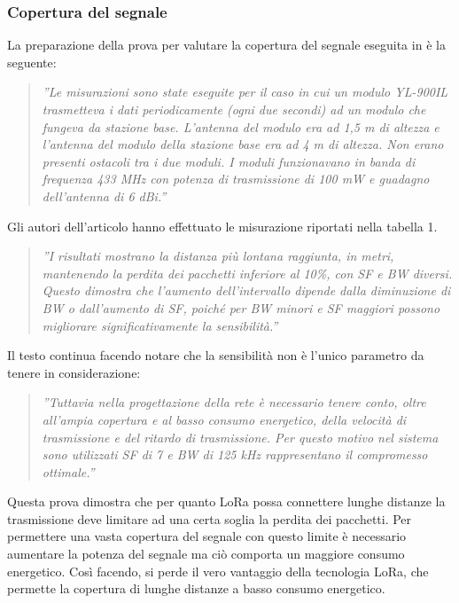 \documentclass[a4paper]{report} %
\begin{document}
\subsubsection{Copertura del segnale}
La preparazione della prova per valutare la copertura del segnale eseguita in \cite{art:rif.44} è la seguente:
\begin{quote}
	\textit{''Le misurazioni sono state eseguite per il caso in cui un modulo YL-900IL trasmetteva i dati periodicamente (ogni due secondi) ad un modulo che fungeva da stazione base. L'antenna del modulo era ad 1,5 m di altezza e l'antenna del modulo della stazione base era ad 4 m di altezza. Non erano presenti ostacoli tra i due moduli. I moduli funzionavano in banda di frequenza 433 MHz con potenza di trasmissione di 100 mW e guadagno dell'antenna di 6 dBi.''}
\end{quote}
Gli autori dell'articolo \cite{art:rif.44} hanno effettuato le misurazione riportati nella tabella 1. %
\begin{quote}
	\textit{''I risultati mostrano la distanza più lontana raggiunta, in metri, mantenendo la perdita dei pacchetti inferiore al 10\%, con SF e BW diversi. Questo dimostra che l'aumento dell'intervallo dipende dalla diminuzione di BW o dall'aumento di SF, poiché per BW minori e SF maggiori possono migliorare significativamente la sensibilità.''}
\end{quote}
Il testo continua facendo notare che la sensibilità non è l'unico parametro da tenere in considerazione:
\begin{quote}
	\textit{''Tuttavia nella progettazione della rete è necessario tenere conto, oltre all'ampia copertura e al basso consumo energetico, della velocità di trasmissione e del ritardo di trasmissione. Per questo motivo nel sistema sono utilizzati SF di 7 e BW di 125 kHz rappresentano il compromesso ottimale.''}
\end{quote}
Questa prova dimostra che per quanto LoRa possa connettere lunghe distanze la trasmissione deve limitare ad una certa soglia la perdita dei pacchetti. Per permettere una vasta copertura del segnale con questo limite è necessario aumentare la potenza del segnale ma ciò comporta un maggiore consumo energetico. Così facendo, si perde il vero vantaggio della tecnologia LoRa, che permette la copertura di lunghe distanze a basso consumo energetico.  
\end{document}
